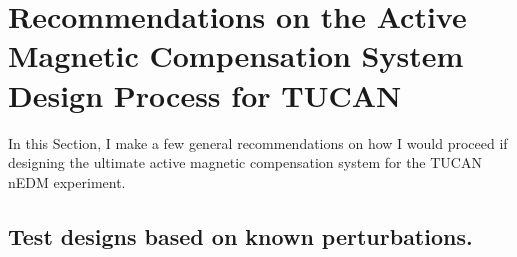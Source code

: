 \section{Recommendations on the Active Magnetic Compensation System Design Process for TUCAN}


In this Section, I make a few general recommendations on how I would proceed if designing the ultimate active magnetic compensation system for the TUCAN nEDM experiment.


\subsection{Test designs based on known perturbations.\label{sec:sources}}


